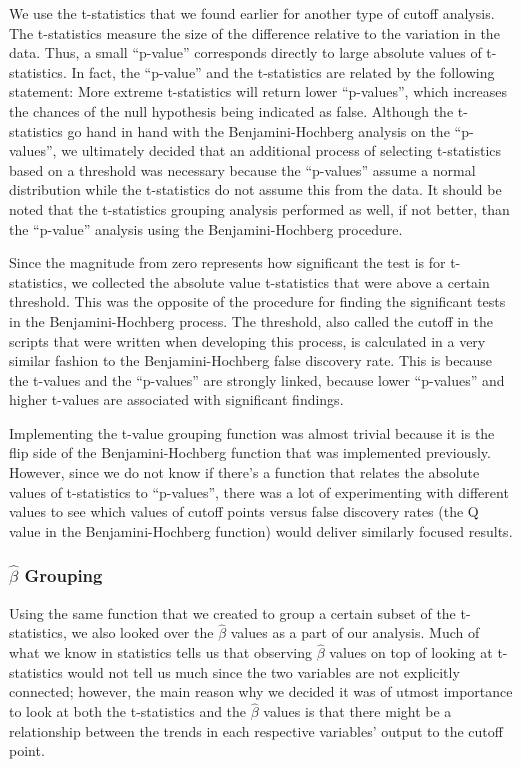 \par We use the t-statistics that we found earlier for another type of cutoff
analysis. The t-statistics measure the size of the difference relative to the 
variation in the data. Thus, a small ``p-value'' corresponds directly to large
absolute values of t-statistics. In fact, the ``p-value'' and the t-statistics
are related by the following statement: More extreme t-statistics will return 
lower ``p-values'', which increases the chances of the null hypothesis being 
indicated as false. Although the t-statistics go hand in hand with the 
Benjamini-Hochberg analysis on the ``p-values'', we ultimately decided that an 
additional process of selecting t-statistics based on a threshold was 
necessary because the ``p-values'' assume a normal distribution while the 
t-statistics do not assume this from the data. It should be noted that the 
t-statistics grouping analysis performed as well, if not better, than the 
``p-value'' analysis using the Benjamini-Hochberg procedure.

\par Since the magnitude from zero represents how significant the test is for
t-statistics, we collected the absolute value t-statistics that were above a 
certain threshold. This was the opposite of the procedure for finding the 
significant tests in the Benjamini-Hochberg process. The threshold, also called
the cutoff in the scripts that were written when developing this process, is 
calculated in a very similar fashion to the Benjamini-Hochberg false discovery 
rate. This is because the t-values and the ``p-values'' are strongly linked,
because lower ``p-values'' and higher t-values are associated with significant 
findings. 

\par Implementing the t-value grouping function was almost trivial because it 
is the flip side of the Benjamini-Hochberg function that was implemented 
previously. However, since we do not know if there's a function that relates 
the absolute values of t-statistics to ``p-values'', there was a lot of 
experimenting with different values to see which values of cutoff points versus
false discovery rates (the Q value in the Benjamini-Hochberg function) would 
deliver similarly focused results.

\subsubsection{$\hat{\beta}$ Grouping}

\par Using the same function that we created to group a certain subset of the 
t-statistics, we also looked over the $\hat{\beta}$ values as a part of our 
analysis. Much of what we know in statistics tells us that observing 
$\hat{\beta}$ values on top of looking at t-statistics would not tell us much 
since the two variables are not explicitly connected; however, the main reason 
why we decided it was of utmost importance to look at both the t-statistics 
and the $\hat{\beta}$ values is that there might be a relationship between the 
trends in each respective variables' output to the cutoff point. 

